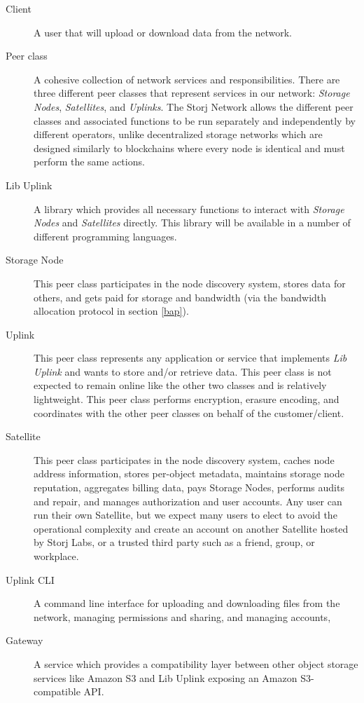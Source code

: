 \documentclass[8pt,fleqn,openany]{book}
\begin{document}
\begin{description}
\item[Client] A user that will upload or download data from the network.

\item[Peer class] A cohesive collection of network services and
  responsibilities. There are three different peer classes that represent
  services in our network: {\em Storage Nodes}, {\em Satellites}, and {\em Uplinks}.
  The Storj Network allows the different peer classes and associated functions to be
  run separately and independently by different operators, unlike decentralized storage networks which are designed similarly to blockchains where every node is identical and must perform the same actions.
  
\item[Lib Uplink] A library which provides all necessary functions to interact with {\em Storage Nodes} and {\em Satellites} directly. This library will be available in a number of different programming languages.

\item[Storage Node] This peer class participates in the node discovery
  system, stores data for others, and gets paid for storage and bandwidth
  (via the bandwidth allocation protocol in section \ref{bap}).

\item[Uplink] This peer class represents any application or
  service that implements {\em Lib Uplink} and wants to store and/or retrieve data. This peer class
  is not expected to remain online like the other two classes and is
  relatively lightweight. This peer class performs encryption, erasure encoding,
  and coordinates with the other peer classes on behalf of the customer/client.

\item[Satellite] This peer class participates in the node discovery system,
  caches node address information, stores per-object metadata, maintains storage
  node reputation, aggregates billing data, pays Storage Nodes, performs audits and repair, and manages
  authorization and user accounts.
  Any user can run their own Satellite, but we expect many users
  to elect to avoid the operational complexity and create an account on
  another Satellite hosted by Storj Labs, or a trusted third party such as a friend, group, or
  workplace.
  
\item[Uplink CLI] A command line interface for uploading and downloading files from the network, managing permissions and sharing, and managing accounts, 

\item[Gateway] A service which provides a compatibility layer between other object storage services like Amazon S3 and Lib Uplink exposing an Amazon S3-compatible API.

\end{description}
\end{document}
